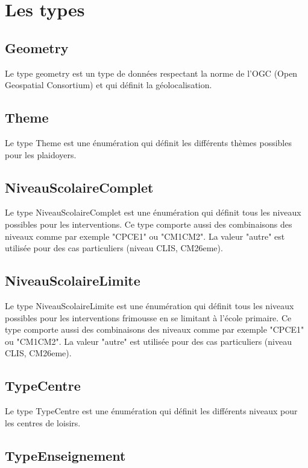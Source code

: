 \documentclass[asi, sansVersion]{picInsa}
\begin{document}
\section{Les types}

\subsection*{Geometry}

Le type geometry est un type de données respectant la norme de l'OGC (Open Geospatial Consortium) et qui définit la géolocalisation.

\subsection*{Theme}

Le type Theme est une énumération qui définit les différents thèmes possibles pour les plaidoyers.

\subsection*{NiveauScolaireComplet}

Le type NiveauScolaireComplet est une énumération qui définit tous les niveaux possibles pour les interventions. Ce type comporte aussi des combinaisons des niveaux comme par exemple "CPCE1" ou "CM1CM2". La valeur "autre" est utilisée pour des cas particuliers (niveau CLIS, CM26eme).

\subsection*{NiveauScolaireLimite}

Le type NiveauScolaireLimite est une énumération qui définit tous les niveaux possibles pour les interventions frimousse en se limitant à l'école primaire. Ce type comporte aussi des combinaisons des niveaux comme par exemple "CPCE1" ou "CM1CM2". La valeur "autre" est utilisée pour des cas particuliers (niveau CLIS, CM26eme).

\subsection*{TypeCentre}

Le type TypeCentre est une énumération qui définit les différents niveaux pour les centres de loisirs.

\subsection*{TypeEnseignement}
\end{document}
